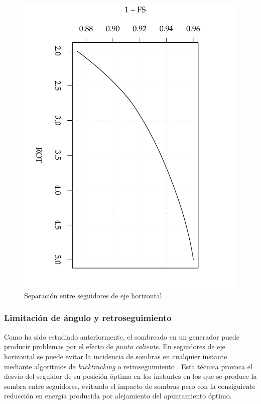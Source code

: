 \begin{figure}
  \centering
  \includegraphics[scale=0.7, angle=90]{../figs/AbacoSeguidorHorizSombra_Ene10}

  \caption{Separación entre seguidores de eje horizontal.}
  \label{fig:SeguidoresEjeHorizontalSeparacion}
\end{figure}

\subsubsection{Limitación de ángulo y retroseguimiento}
\label{sec:backtracking}

Como ha sido estudiado anteriormente, el sombreado en un generador puede producir problemas por
el efecto de \emph{punto caliente}. En seguidores de eje horizontal se puede evitar la incidencia
de sombras en cualquier instante mediante algoritmos de
\emph{backtracking} o retroseguimiento
\cite{Panico.Garvison.ea1991}. Esta técnica provoca el desvío del seguidor de su posición óptima en los
instantes en los que se produce la sombra entre seguidores, evitando
el impacto de sombras pero con la consiguiente reducción en energía
producida por alejamiento del apuntamiento óptimo.

